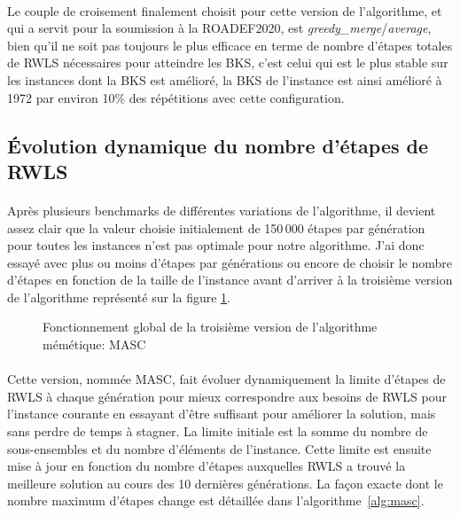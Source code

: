 \documentclass[a4paper,11pt,twoside,french,report]{../common/simplem}
\begin{document}
				\paragraph*{}
					Le couple de croisement finalement choisit pour cette version de l'algorithme, et qui a servit pour la soumission à la \acrshort{ROADEF2020}, est \textit{greedy\_merge}/\textit{average}, bien qu'il ne soit pas toujours le plus efficace en terme de nombre d'étapes totales de \gls{RWLS} nécessaires pour atteindre les \gls{BKS}, c'est celui qui est le plus stable sur les instances dont la \gls{BKS} est amélioré, la \gls{BKS} de l'instance  est ainsi amélioré à 1972 par environ 10\% des répétitions avec cette configuration.
			\subsection{Évolution dynamique du nombre d'étapes de \acrshort{RWLS}}
				\paragraph*{}
					Après plusieurs benchmarks de différentes variations de l'algorithme, il devient assez clair que la valeur choisie initialement de 150\,000 étapes par génération pour toutes les instances n'est pas optimale pour notre algorithme. J'ai donc essayé avec plus ou moins d'étapes par générations ou encore de choisir le nombre d'étapes en fonction de la taille de l'instance avant d'arriver à la troisième version de l'algorithme représenté sur la figure \ref{fig:memetic_algorithm_v3}.
				\begin{figure}[H]
					\centering%
					\caption{Fonctionnement global de la troisième version de l'algorithme mémétique: \acrshort{MASC}}%
					\label{fig:memetic_algorithm_v3}%
				\end{figure}
				\paragraph*{}
					Cette version, nommée \gls{MASC}, fait évoluer dynamiquement la limite d'étapes de \gls{RWLS} à chaque génération pour mieux correspondre aux besoins de \gls{RWLS} pour l'instance courante en essayant d'être suffisant pour améliorer la solution, mais sans perdre de temps à stagner. La limite initiale est la somme du nombre de sous-ensembles et du nombre d'éléments de l'instance. Cette limite est ensuite mise à jour en fonction du nombre d'étapes auxquelles RWLS a trouvé la meilleure solution au cours des 10 dernières générations. La façon exacte dont le nombre maximum d'étapes change est détaillée dans l'algorithme~\ref{alg:masc}.
\end{document}
